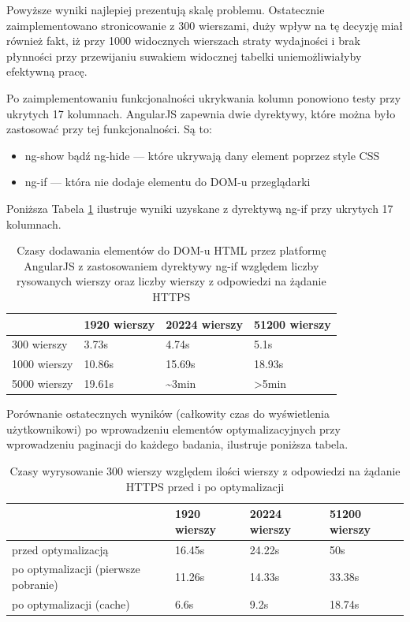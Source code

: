 \documentclass[a4paper,12pt,twoside]{article}
\begin{document}
Powyższe wyniki najlepiej prezentują skalę problemu. Ostatecznie zaimplementowano
stronicowanie z 300 wierszami, duży wpływ na tę decyzję miał również fakt, iż
przy 1000 widocznych wierszach straty wydajności i brak płynności przy przewijaniu
suwakiem widocznej tabelki uniemożliwiałyby efektywną pracę.

Po zaimplementowaniu funkcjonalności ukrykwania kolumn ponowiono testy przy ukrytych 17 kolumnach. AngularJS zapewnia dwie dyrektywy, które można było zastosować przy tej funkcjonalności. Są to:
\begin{itemize}
\item ng-show bądź ng-hide — które ukrywają dany element poprzez style CSS
\item ng-if — która nie dodaje elementu do DOM-u przeglądarki
\end{itemize}

Poniższa Tabela \ref{table:tableRenderNgIf} ilustruje wyniki uzyskane z dyrektywą ng-if przy ukrytych 17 kolumnach.
\begin{table} [H]
\begin{tabular}{| p{3cm} | p{3cm} | p{3cm} | p{3cm}|}
\hline
& 1920 wierszy & 20224 wierszy & 51200 wierszy\\
\hline
300 wierszy& 3.73s& 4.74s& 5.1s\\ \hline
1000 wierszy& 10.86s & 15.69s& 18.93s\\ \hline
5000 wierszy& 19.61s& \textasciitilde 3min& >5min\\ \hline
\end{tabular}
\caption{Czasy dodawania elementów do DOM-u HTML przez platformę AngularJS z zastosowaniem dyrektywy ng-if względem liczby rysowanych wierszy oraz liczby wierszy z odpowiedzi na żądanie HTTPS}
\label{table:tableRenderNgIf}
\end{table}

Porównanie ostatecznych wyników (całkowity czas do wyświetlenia użytkownikowi) po wprowadzeniu elementów optymalizacyjnych przy
wprowadzeniu paginacji do każdego badania, ilustruje poniższa
tabela.

\begin{table} [H]
\begin{tabular}{| p{3cm} | p{3cm} | p{3cm} | p{3cm}|}
\hline
& 1920 wierszy & 20224 wierszy & 51200 wierszy\\
\hline
przed optymalizacją& 16.45s& 24.22s& 50s\\ \hline
po optymalizacji (pierwsze pobranie)& 11.26s & 14.33s& 33.38s\\ \hline
po optymalizacji (cache)& 6.6s& 9.2s& 18.74s\\ \hline
\end{tabular}
\caption{Czasy wyrysowanie 300 wierszy względem ilości wierszy z odpowiedzi na żądanie HTTPS przed i po optymalizacji}
\label{table:summaryRender}
\end{table}
\end{document}
